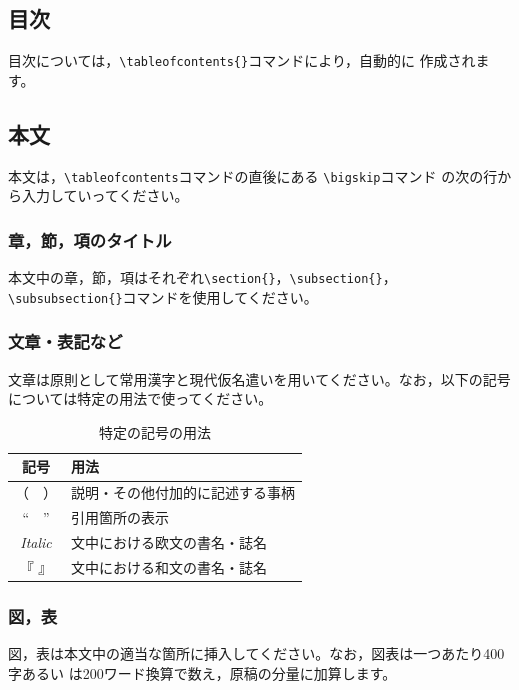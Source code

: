 \documentclass[b5paper,10pt,twocolumn,tombow]{jarticle}
\begin{document}
\subsection{目次}
目次については，\verb|\tableofcontents{}|コマンドにより，自動的に
作成されます。
\subsection{本文}
本文は，\verb|\tableofcontents|コマンドの直後にある
\verb|\bigskip|コマンド
の次の行から入力していってください。
\subsubsection{章，節，項のタイトル}
本文中の章，節，項はそれぞれ\verb|\section{}|，\verb|\subsection{}|，
\verb|\subsubsection{}|コマンドを使用してください。

\subsubsection{文章・表記など}
文章は原則として常用漢字と現代仮名遣いを用いてください。なお，以下の記号
については特定の用法で使ってください。
\begin{table}[h!]
  \center
  \small
  \begin{tabular}{cl}
    \toprule
    記号 & 用法 \\
    \midrule
    （　） & 説明・その他付加的に記述する事柄 \\
    ``　'' & 引用箇所の表示 \\
    \textit{Italic} & 文中における欧文の書名・誌名 \\
    『 』 & 文中における和文の書名・誌名 \\
    \bottomrule
  \end{tabular}
  \caption{特定の記号の用法}
\end{table}
\normalsize


\subsubsection{図，表}
図，表は本文中の適当な箇所に挿入してください。なお，図表は一つあたり400字あるい
は200ワード換算で数え，原稿の分量に加算します。
\end{document}
